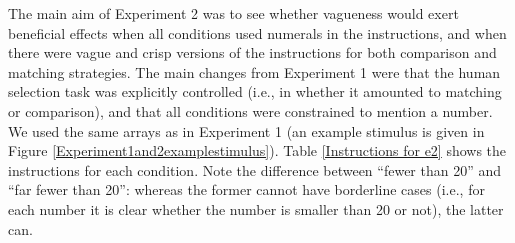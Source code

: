 
The main aim of Experiment 2 was to see whether vagueness would exert beneficial effects when all conditions used numerals in the instructions, and when there were vague and crisp versions of the instructions for both comparison and matching strategies. The main changes from Experiment 1 were that the human selection task was explicitly controlled (i.e., in whether it amounted to matching or comparison), and that all conditions were constrained to mention a number. We used the same arrays as in Experiment 1 (an example stimulus is given in Figure \ref{Experiment1and2examplestimulus}). Table \ref{Instructions for e2} shows the instructions for each condition. Note the difference between ``fewer than 20'' and ``far fewer than 20'': whereas the former cannot have borderline cases (i.e., for each number it is clear whether the number is smaller than 20 or not), the latter can.

